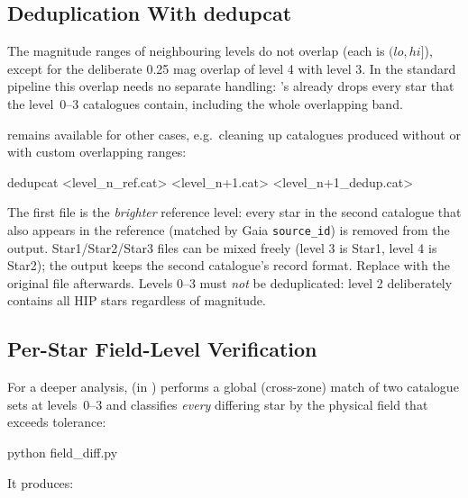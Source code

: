 \subsection{Deduplication With dedupcat}
\label{sec:StarCatalogues:Generating:dedup}

The magnitude ranges of neighbouring levels do not overlap (each is
$(lo, hi]$), except for the deliberate 0.25 mag overlap of level 4 with
level 3. In the standard pipeline this overlap needs no separate
handling: 's  already drops
every star that the level~0--3 catalogues contain, including the whole
overlapping band.

 remains available for other cases, e.g.\ cleaning up
catalogues produced without  or with custom
overlapping ranges:

\begin{commands}
dedupcat <level_n_ref.cat> <level_n+1.cat> <level_n+1_dedup.cat>
\end{commands}

The first file is the \emph{brighter} reference level: every star in the
second catalogue that also appears in the reference (matched by Gaia
\texttt{source\_id}) is removed from the output. Star1/Star2/Star3 files
can be mixed freely (level 3 is Star1, level 4 is Star2); the output keeps
the second catalogue's record format. Replace
 with the original  file
afterwards. Levels 0--3 must \emph{not} be deduplicated: level 2
deliberately contains all HIP stars regardless of magnitude.

\subsection{Per-Star Field-Level Verification}
\label{sec:StarCatalogues:Generating:fielddiff}

For a deeper analysis,  (in
) performs a global (cross-zone) match of two
catalogue sets at levels~0--3 and classifies \emph{every} differing star
by the physical field that exceeds tolerance:

\begin{commands}
python field_diff.py
\end{commands}

It produces:

